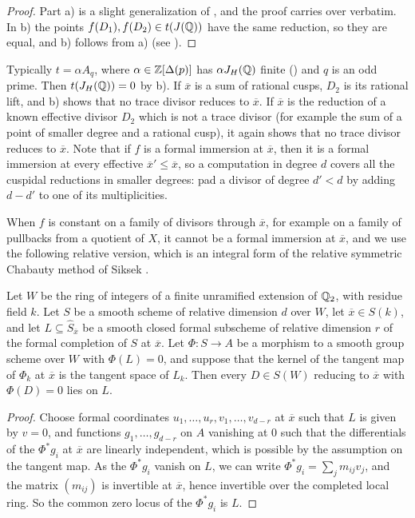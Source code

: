 \begin{proof}
Part a) is a slight generalization of \cite[Lemma 4.2]{DKSS}, and the proof carries over verbatim. In b) the points $f(D_1),f(D_2)\in t(J(\mathbb{Q}))$ have the same reduction, so they are equal, and b) follows from a) (see \cite[Corollaries 4.3 and 4.4, Lemma 8.2]{DKSS}).
\end{proof}

Typically $t=\alpha A_q$, where $\alpha\in\mathbb{Z}[\Delta(p)]$ has $\alpha J_H(\mathbb{Q})$ finite () and $q$ is an odd prime. Then $t(J_H(\mathbb{Q}))=0$ by  b). If $\overline x$ is a sum of rational cusps, $D_2$ is its rational lift, and  b) shows that no trace divisor reduces to $\overline x$. If $\overline x$ is the reduction of a known effective divisor $D_2$ which is not a trace divisor (for example the sum of a point of smaller degree and a rational cusp), it again shows that no trace divisor reduces to $\overline x$. Note that if $f$ is a formal immersion at $\overline x$, then it is a formal immersion at every effective $\overline x'\leq\overline x$, so a computation in degree $d$ covers all the cuspidal reductions in smaller degrees: pad a divisor of degree $d'<d$ by adding $d-d'$ to one of its multiplicities.

When $f$ is constant on a family of divisors through $\overline x$, for example on a family of pullbacks from a quotient of $X$, it cannot be a formal immersion at $\overline x$, and we use the following relative version, which is an integral form of the relative symmetric Chabauty method of Siksek \cite[Section 4]{siksek}.

\begin{lemma}\label{lem:relative}
Let $W$ be the ring of integers of a finite unramified extension of $\mathbb{Q}_2$, with residue field $k$. Let $S$ be a smooth scheme of relative dimension $d$ over $W$, let $\overline x\in S(k)$, and let $L\subseteq\widehat S_{\overline x}$ be a smooth closed formal subscheme of relative dimension $r$ of the formal completion of $S$ at $\overline x$. Let $\Phi:S\to A$ be a morphism to a smooth group scheme over $W$ with $\Phi(L)=0$, and suppose that the kernel of the tangent map of $\Phi_k$ at $\overline x$ is the tangent space of $L_k$. Then every $D\in S(W)$ reducing to $\overline x$ with $\Phi(D)=0$ lies on $L$.
\end{lemma}

\begin{proof}
Choose formal coordinates $u_1,\dots,u_r,v_1,\dots,v_{d-r}$ at $\overline x$ such that $L$ is given by $v=0$, and functions $g_1,\dots,g_{d-r}$ on $A$ vanishing at $0$ such that the differentials of the $\Phi^*g_i$ at $\overline x$ are linearly independent, which is possible by the assumption on the tangent map. As the $\Phi^*g_i$ vanish on $L$, we can write $\Phi^*g_i=\sum_jm_{ij}v_j$, and the matrix $(m_{ij})$ is invertible at $\overline x$, hence invertible over the completed local ring. So the common zero locus of the $\Phi^*g_i$ is $L$.
\end{proof}

